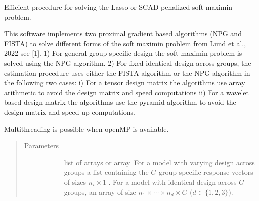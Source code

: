 \documentclass[letterpaper,10pt,english]{sphinxmanual}
\begin{document}

\begin{fulllineitems}
\label{\detokenize{pysmme:pysmme.tools.softmaximin}}
\sphinxAtStartPar
Efficient procedure for solving the Lasso or SCAD penalized soft maximin problem.

\sphinxAtStartPar
This software implements two proximal
gradient based algorithms (NPG and FISTA) to solve different forms of the soft
maximin problem from Lund et al., 2022 see {[}1{]}. 1) For general group specific
design the soft maximin problem is solved using the NPG algorithm.
2) For fixed identical design across groups, the estimation procedure uses 
either the FISTA algorithm or the NPG algorithm in the following two cases:
i) For a tensor design matrix the algorithms use array arithmetic  to 
avoid the design matrix and speed computations ii) For a wavelet based design 
matrix the algorithms use the pyramid algorithm to avoid the design matrix and speed up
computations.

\sphinxAtStartPar
Multi\sphinxhyphen{}threading is possible when openMP is available.
\begin{quote}\begin{description}
\item[{Parameters}] \leavevmode\begin{description}
\item[{}] \leavevmode{[}list of arrays or array{]}
\sphinxAtStartPar
For a model with varying design across groups a list containing the \(G\) group specific 
response vectors of sizes \(n_i \times 1\) . For a model with identical design 
across \(G\) groups, 
an array of size \(n_1 \times\cdots\times n_d \times G\) (\(d \in \{ 1, 2, 3\}\)).


\end{description}
\end{description}
\end{quote}
\end{fulllineitems}
\end{document}
